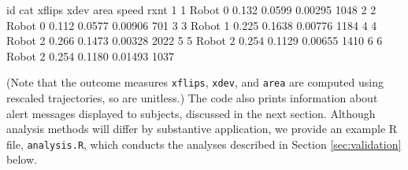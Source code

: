 \documentclass[]{article}
\newenvironment{Shaded}{\begin{snugshade}}{\end{snugshade}}
\newcommand{\DecValTok}[1]{\textcolor[rgb]{0.00,0.00,0.81}{#1}}
\newcommand{\FloatTok}[1]{\textcolor[rgb]{0.00,0.00,0.81}{#1}}
\newcommand{\NormalTok}[1]{#1}
\begin{document}
\begin{Shaded}
\begin{Highlighting}[]
\NormalTok{  id   cat xflips  xdev   area   speed rxnt }
\DecValTok{1}  \DecValTok{1}\NormalTok{ Robot      }\DecValTok{0} \FloatTok{0.132} \FloatTok{0.0599} \FloatTok{0.00295} \DecValTok{1048}         
\DecValTok{2}  \DecValTok{2}\NormalTok{ Robot      }\DecValTok{0} \FloatTok{0.112} \FloatTok{0.0577} \FloatTok{0.00906}  \DecValTok{701}         
\DecValTok{3}  \DecValTok{3}\NormalTok{ Robot      }\DecValTok{1} \FloatTok{0.225} \FloatTok{0.1638} \FloatTok{0.00776} \DecValTok{1184}         
\DecValTok{4}  \DecValTok{4}\NormalTok{ Robot      }\DecValTok{2} \FloatTok{0.266} \FloatTok{0.1473} \FloatTok{0.00328} \DecValTok{2022}         
\DecValTok{5}  \DecValTok{5}\NormalTok{ Robot      }\DecValTok{2} \FloatTok{0.254} \FloatTok{0.1129} \FloatTok{0.00655} \DecValTok{1410}         
\DecValTok{6}  \DecValTok{6}\NormalTok{ Robot      }\DecValTok{2} \FloatTok{0.254} \FloatTok{0.1180} \FloatTok{0.01493} \DecValTok{1037}         
\end{Highlighting}
\end{Shaded}

(Note that the outcome measures \texttt{xflips}, \texttt{xdev}, and
\texttt{area} are computed using rescaled trajectories, so are
unitless.) The code also prints information about alert messages
displayed to subjects, discussed in the next section. Although analysis
methods will differ by substantive application, we provide an example R
file, \texttt{analysis.R}, which conducts the analyses described in
Section \ref{sec:validation} below.

\singlespacing
\end{document}
